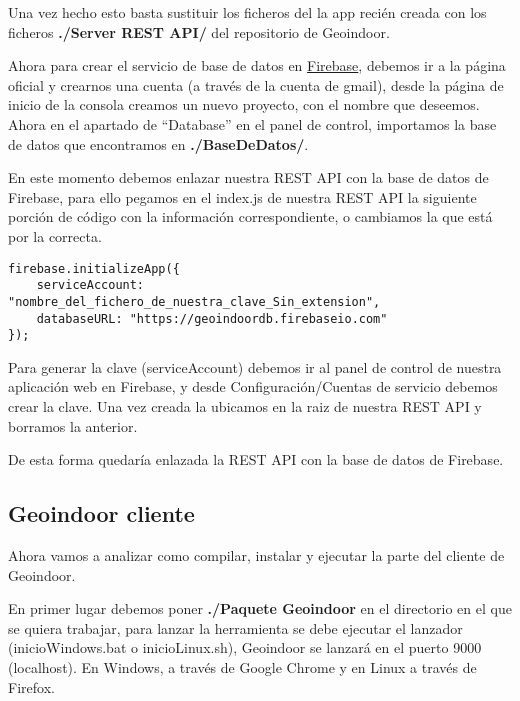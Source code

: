 Una vez hecho esto basta sustituir los ficheros del la app recién creada con los ficheros \textbf{./Server REST API/} del repositorio de Geoindoor.


Ahora para crear el servicio de base de datos en \href{http://firebase.google.com/}{Firebase}, debemos ir a la página oficial y crearnos una cuenta (a través de la cuenta de gmail), desde la página de inicio de la consola creamos un nuevo proyecto, con el nombre que deseemos. Ahora en el apartado de ``Database'' en el panel de control, importamos la base de datos que encontramos en \textbf{./BaseDeDatos/}. 



En este momento debemos enlazar nuestra REST API con la base de datos de Firebase, para ello pegamos en el index.js de nuestra REST API la siguiente porción de código con la información correspondiente, o cambiamos la que está por la correcta.


\begin{verbatim}
firebase.initializeApp({
	serviceAccount: "nombre_del_fichero_de_nuestra_clave_Sin_extension",
	databaseURL: "https://geoindoordb.firebaseio.com"
});
\end{verbatim}


Para generar la clave (serviceAccount) debemos ir al panel de control de nuestra aplicación web en Firebase, y desde Configuración/Cuentas de servicio debemos crear la clave. Una vez creada la ubicamos en la raiz de nuestra REST API y borramos la anterior.

De esta forma quedaría enlazada la REST API con la base de datos de Firebase.

\cite{herokutut}

\subsection{Geoindoor cliente}

Ahora vamos a analizar como compilar, instalar y ejecutar la parte del cliente de Geoindoor.

En primer lugar debemos poner \textbf{./Paquete Geoindoor} en el directorio en el que se quiera trabajar, para lanzar la herramienta se debe ejecutar el lanzador (inicioWindows.bat o inicioLinux.sh), Geoindoor se lanzará en el puerto 9000 (localhost). En Windows, a través de Google Chrome y en Linux a través de Firefox.

